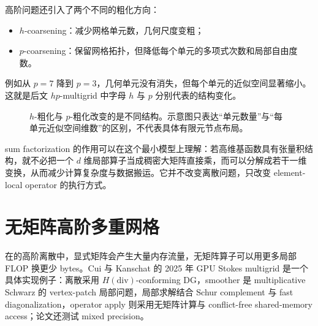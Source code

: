 高阶问题还引入了两个不同的粗化方向：
\begin{itemize}
\item $h$-coarsening：减少网格单元数，几何尺度变粗；
\item $p$-coarsening：保留网格拓扑，但降低每个单元的多项式次数和局部自由度数。
\end{itemize}
例如从 $p=7$ 降到 $p=3$，几何单元没有消失，但每个单元的近似空间显著缩小。这就是后文 $hp$-multigrid 中字母 $h$ 与 $p$ 分别代表的结构变化。

\begin{figure}[htbp]
\centering
{}
\caption{$h$-粗化与 $p$-粗化改变的是不同结构。示意图只表达“单元数量”与“每单元近似空间维数”的区别，不代表具体有限元节点布局。}
\label{fig:modern-h-p-coarsening}
\end{figure}

sum factorization 的作用可以在这个最小模型上理解：若高维基函数具有张量积结构，就不必把一个 $d$ 维局部算子当成稠密大矩阵直接乘，而可以分解成若干一维变换，从而减少计算复杂度与数据搬运。它并不改变离散问题，只改变 element-local operator 的执行方式。

\section{无矩阵高阶多重网格}

在的高阶离散中，显式矩阵会产生大量内存流量，无矩阵算子可以用更多局部 FLOP 换更少 bytes。Cui 与 Kanschat 的 2025 年 GPU Stokes multigrid 是一个具体实现例子：离散采用 $H(\mathrm{div})$-conforming DG，smoother 是 multiplicative Schwarz 的 vertex-patch 局部问题，局部求解结合 Schur complement 与 fast diagonalization，operator apply 则采用无矩阵计算与 conflict-free shared-memory access；论文还测试 mixed precision\cite{stokesgpu2025}。

